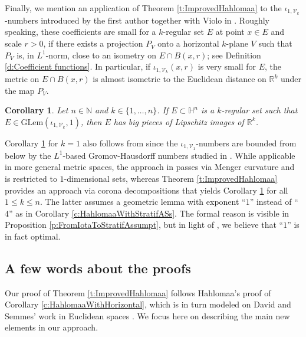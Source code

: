 \documentclass[12pt]{amsart}
\numberwithin{equation}{section}
\theoremstyle{plain}
\newtheorem{corollary}[theorem]{Corollary}
\theoremstyle{definition}
\theoremstyle{remark}
\begin{document}
Finally, we mention an application of Theorem \ref{t:ImprovedHahlomaa} to the $\iota_{1,\mathcal{V}_k}$-numbers introduced by the first author together with Violo in \cite{FV2}. Roughly speaking, these coefficients are small for a $k$-regular set $E$ at point $x\in E$ and scale $r>0$, if there exists a projection $P_V$ onto a horizontal $k$-plane $V$ such that $P_V$ is, in $L^1$-norm, close to an isometry on $E\cap B(x,r)$; see Definition \ref{d:Coefficient functions}.
In particular, if $\iota_{1,\mathcal{V}_k}(x,r)$ is very small for  $E$, the metric on  $E\cap B(x,r)$ is almost isometric to the Euclidean distance on $\mathbb{R}^k$ under the map $P_V$.


\begin{corollary}\label{c:HahlomaaWithIotaASs}
     Let $n\in \mathbb{N}$ and $k\in \{1,\ldots,n\}$. If $E\subset \mathbb{H}^n$ is a $k$-regular set such that $E\in \mathrm{GLem}(\iota_{1,\mathcal{V}_k},1)$, then $E$ has big pieces of Lipschitz images of $\mathbb{R}^k$. 
\end{corollary}

Corollary \ref{c:HahlomaaWithIotaASs} for $k=1$ also follows from  \cite[Thm 1.4]{FV1} since the $\iota_{1,\mathcal{V}_1}$-numbers are bounded from below by the $L^1$-based Gromov-Hausdorff numbers studied in \cite{FV1}. While applicable in more general metric spaces, the approach in \cite{FV1} passes via Menger curvature and is restricted to $1$-dimensional sets, whereas Theorem \ref{t:ImprovedHahlomaa} provides an approach via corona decompositions that yields Corollary  \ref{c:HahlomaaWithIotaASs} for all $1\leq k\leq n$. The latter assumes a geometric lemma with 
exponent ``$1$'' instead of ``$4$'' as in Corollary \ref{c:HahlomaaWithStratifASs}. The formal reason is visible in 
Proposition \ref{p:FromIotaToStratifAssumpt}, but in light of \cite{MR4489627,FV1,FV2}, we believe that ``$1$'' is in fact optimal.

\subsection*{A few words about the proofs} Our proof of Theorem \ref{t:ImprovedHahlomaa} follows Hahlomaa's proof of 
Corollary \ref{c:HahlomaaWithHorizontal}, which is in turn modeled on  David and Semmes' work in Euclidean spaces \cite[(C3) $\Rightarrow$ (C4) $\Rightarrow$ (C6)]{David1}. We focus here on describing the main new elements in our approach.
\end{document}
